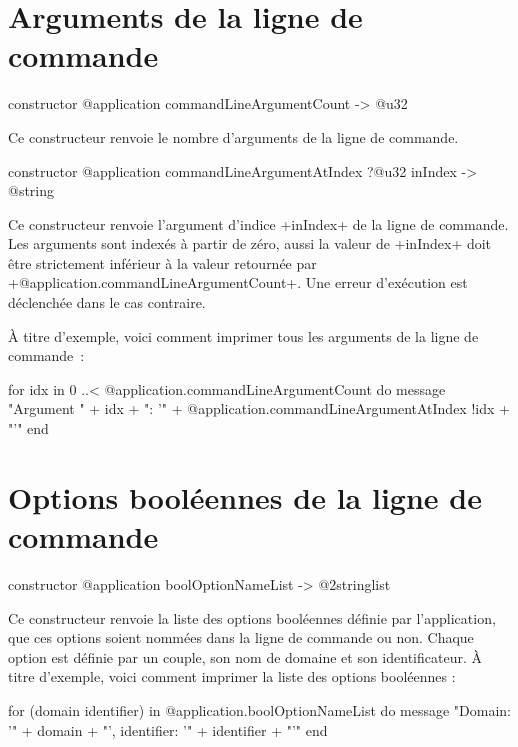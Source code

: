 \section{Arguments de la ligne de commande}



\begin{galgas4box}
constructor @application commandLineArgumentCount -> @u32
\end{galgas4box}

Ce constructeur renvoie le nombre d'arguments de la ligne de commande.



\begin{galgas4box}
constructor @application commandLineArgumentAtIndex ?@u32 inIndex
  -> @string
\end{galgas4box}

Ce constructeur renvoie l'argument d'indice \ggsq+inIndex+ de la ligne de commande. Les arguments sont indexés à partir de zéro, aussi la valeur de \ggsq+inIndex+ doit être strictement inférieur à la valeur retournée par \ggsq+@application.commandLineArgumentCount+. Une erreur d'exécution est déclenchée dans le cas contraire.

À titre d'exemple, voici comment imprimer tous les arguments de la ligne de commande~:
\begin{galgas4}
for idx in 0 ..< @application.commandLineArgumentCount do
  message "Argument " + idx + ": '"
    + @application.commandLineArgumentAtIndex {!idx} + "'\n"
end
\end{galgas4}










\section{Options booléennes de la ligne de commande}


\begin{galgas4box}
constructor @application boolOptionNameList -> @2stringlist
\end{galgas4box}

Ce constructeur renvoie la liste des options booléennes définie par l'application, que ces options soient nommées dans la ligne de commande ou non. Chaque option est définie par un couple, son nom de domaine et son identificateur. À titre d'exemple, voici comment imprimer la liste des options booléennes :
\begin{galgas4}
for (domain identifier) in @application.boolOptionNameList do
  message "Domain: '" + domain + "', identifier: '" + identifier + "'\n"
end
\end{galgas4}


